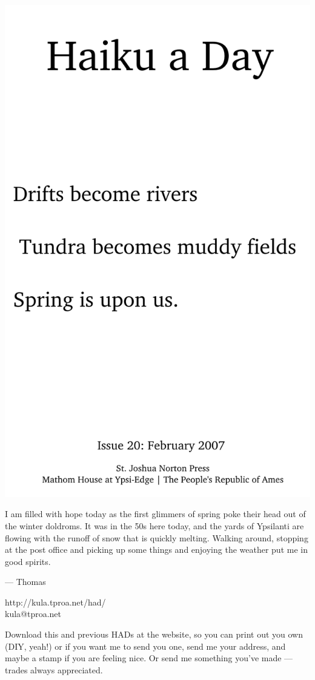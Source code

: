 \documentclass[12pt]{article}
\begin{document}
\includegraphics{frontpage.png}

\newpage

I am filled with hope today as the first glimmers
of spring poke their head out of the winter doldroms.
It was in the 50s here today, and the yards of 
Ypsilanti are flowing with the runoff of snow that
is quickly melting. Walking around, stopping at
the post office and picking up some things and
enjoying the weather put me in good spirits. 

--- Thomas

http://kula.tproa.net/had/ \\
kula@tproa.net

Download this and previous HADs at the website, so you can
print out you own (DIY, yeah!) or if you want me to send
you one, send me your address, and maybe a stamp if you
are feeling nice. Or send me something you've made ---
trades always appreciated.
\end{document}
